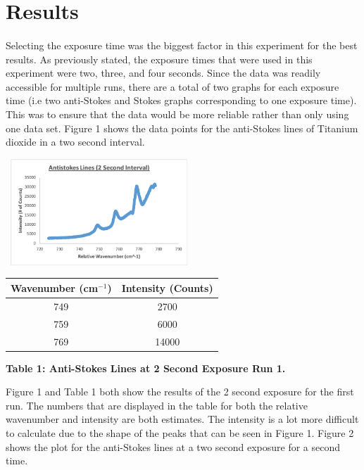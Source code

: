 \documentclass[]{article}
\begin{document}
\section{Results}
\begin{multicols}{2}
\paragraph{}
\setlength{\parskip}{1em}
Selecting the exposure time was the biggest factor in this experiment for the best results. As previously stated, the exposure times that were used in this experiment were two, three, and four seconds. Since the data was readily accessible for multiple runs, there are a total of two graphs for each exposure time (i.e two anti-Stokes and Stokes graphs corresponding to one exposure time). This was to ensure that the data would be more reliable rather than only using one data set. Figure 1 shows the data points for the anti-Stokes lines of Titanium dioxide in a two second interval.
\begin{center}
    \includegraphics[width=7cm, height=4cm]{PHYS 331 RS (2 Sec) 1a.png}
    \caption{\textbf{\small{Figure 1: Anti-Stokes Lines at 2 Second Exposure Run 1.}}}
\end{center}
\begin{tabular}{|c|c|}
    \hline \textbf{Wavenumber (cm$^{-1}$)} & \textbf{Intensity (Counts)} \\ \hline
    749 & 2700 \\ \hline
    759 & 6000 \\ \hline
    769 & 14000 \\ \hline
\end{tabular}
\centerline{\tiny\textbf{{Table 1: Anti-Stokes Lines at 2 Second Exposure Run 1.}}}
\newline
Figure 1 and Table 1 both show the results of the 2 second exposure for the first run. The numbers that are displayed in the table for both the relative wavenumber and intensity are both estimates. The intensity is a lot more difficult to calculate due to the shape of the peaks that can be seen in Figure 1. Figure 2 shows the plot for the anti-Stokes lines at a two second exposure for a second time.

\end{multicols}
\end{document}
